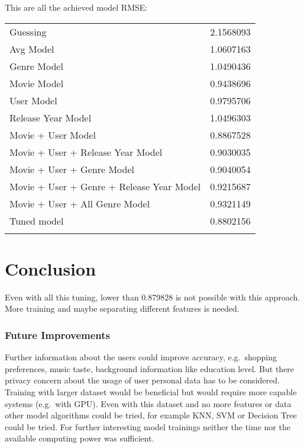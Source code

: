 \documentclass[
]{article}
\begin{document}
This are all the achieved model RMSE:

\begin{table}
\centering
\begin{tabular}{lr}
\toprule
\cellcolor[HTML]{2E86C1}{\textcolor{white}{\textbf{Model}}} & \cellcolor[HTML]{2E86C1}{\textcolor{white}{\textbf{RMSE}}}\\
\midrule
Guessing & 2.1568093\\
Avg Model & 1.0607163\\
Genre Model & 1.0490436\\
Movie Model & 0.9438696\\
User Model & 0.9795706\\
\addlinespace
Release Year Model & 1.0496303\\
Movie + User Model & 0.8867528\\
Movie + User + Release Year Model & 0.9030035\\
Movie + User + Genre Model & 0.9040054\\
Movie + User + Genre + Release Year Model & 0.9215687\\
\addlinespace
Movie + User + All Genre Model & 0.9321149\\
Tuned model & 0.8802156\\
\cellcolor[HTML]{82E0AA}{Final Model Verification} & \cellcolor[HTML]{82E0AA}{0.8798280}\\
\bottomrule
\end{tabular}
\end{table}

\newpage

\hypertarget{conclusion}{%
\section{Conclusion}\label{conclusion}}

Even with all this tuning, lower than 0.879828 is not possible with this
approach. More training and maybe separating different features is
needed.

\hypertarget{future-improvements}{%
\subsubsection{Future Improvements}\label{future-improvements}}

Further information about the users could improve accuracy,
e.g.~shopping preferences, music taste, background information like
education level. But there privacy concern about the usage of user
personal data has to be considered. Training with larger dataset would
be beneficial but would require more capable systems (e.g.~with GPU).
Even with this dataset and no more features or data other model
algorithms could be tried, for example KNN, SVM or Decision Tree could
be tried. For further interesting model trainings neither the time nor
the available computing power was sufficient.
\end{document}
